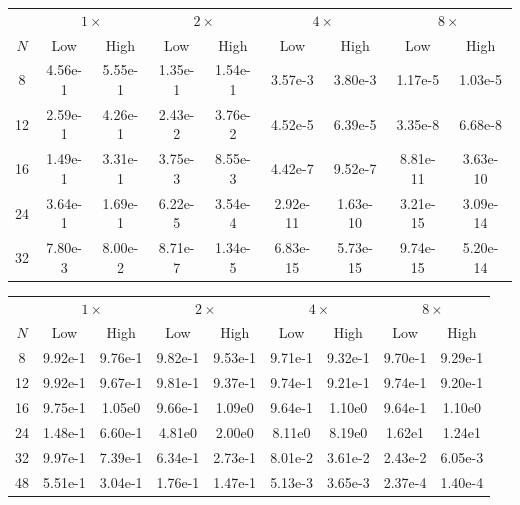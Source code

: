\begin{table}[htpb]
\centering
\begin{tabular}{c|cc|cc|cc|cc|}
 & \multicolumn{2}{c|}{$1 \times$} 
 & \multicolumn{2}{c|}{$2 \times$}
 & \multicolumn{2}{c|}{$4 \times$}
 & \multicolumn{2}{c|}{$8 \times$} \\
 $N$ & Low & High & Low & High & Low & High & Low & High \\
 \hline
 8  & 4.56e-1  & 5.55e-1
    & 1.35e-1  & 1.54e-1
    & 3.57e-3  & 3.80e-3
    & 1.17e-5  & 1.03e-5
    \\
 12 & 2.59e-1  & 4.26e-1
    & 2.43e-2  & 3.76e-2
    & 4.52e-5  & 6.39e-5
    & 3.35e-8  & 6.68e-8
    \\
 16 & 1.49e-1  & 3.31e-1
    & 3.75e-3  & 8.55e-3
    & 4.42e-7  & 9.52e-7
    & 8.81e-11 & 3.63e-10
    \\
 24 & 3.64e-1  & 1.69e-1
    & 6.22e-5  & 3.54e-4
    & 2.92e-11 & 1.63e-10
    & 3.21e-15 & 3.09e-14
    \\
 32 & 7.80e-3  & 8.00e-2
    & 8.71e-7  & 1.34e-5
    & 6.83e-15 & 5.73e-15
    & 9.74e-15 & 5.20e-14
\end{tabular}


\begin{tabular}{c|cc|cc|cc|cc|}
 & \multicolumn{2}{c|}{$1 \times$} 
 & \multicolumn{2}{c|}{$2 \times$}
 & \multicolumn{2}{c|}{$4 \times$}
 & \multicolumn{2}{c|}{$8 \times$} \\
 $N$ & Low & High & Low & High & Low & High & Low & High \\
 \hline
 8  & 9.92e-1 & 9.76e-1
    & 9.82e-1 & 9.53e-1
    & 9.71e-1 & 9.32e-1
    & 9.70e-1 & 9.29e-1
    \\
 12 & 9.92e-1 & 9.67e-1
    & 9.81e-1 & 9.37e-1
    & 9.74e-1 & 9.21e-1
    & 9.74e-1 & 9.20e-1
    \\
 16 & 9.75e-1 & 1.05e0
    & 9.66e-1 & 1.09e0
    & 9.64e-1 & 1.10e0
    & 9.64e-1 & 1.10e0
    \\
 24 & 1.48e-1 & 6.60e-1
    & 4.81e0  & 2.00e0
    & 8.11e0  & 8.19e0
    & 1.62e1  & 1.24e1
    \\
 32 & 9.97e-1 & 7.39e-1
    & 6.34e-1 & 2.73e-1
    & 8.01e-2 & 3.61e-2
    & 2.43e-2 & 6.05e-3
    \\
 48 & 5.51e-1 & 3.04e-1
    & 1.76e-1 & 1.47e-1
    & 5.13e-3 & 3.65e-3
    & 2.37e-4 & 1.40e-4
\end{tabular}


\end{table}
